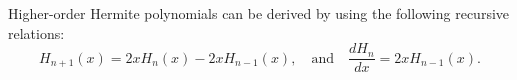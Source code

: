 
\noindent
Higher-order Hermite polynomials can be derived by using the following recursive relations:
\begin{equation}\label{HermitianRecursion}
 H_{n+1}(x) = 2 x H_n(x) - 2 x H_{n-1}(x), \quad \text{and} \quad \frac{d H_n}{d x} = 2 x H_{n-1}(x).
\end{equation}

